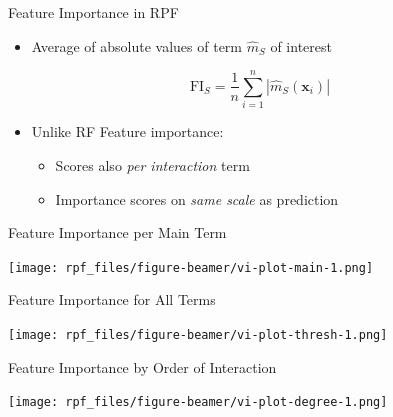 \documentclass[aspectratio=169,12pt]{beamer}
\providecommand{\tightlist}{%
  \setlength{\itemsep}{2pt}\setlength{\parskip}{0pt}}
\begin{document}
\begin{frame}{Feature Importance in RPF}
\label{feature-importance-in-rpf}
\begin{itemize}[<+->]
\tightlist
\item
  Average of absolute values of term \(\hat{m}_S\) of interest
\end{itemize}

\[\mathrm{FI}_S = \frac{1}{n} \sum_{i=1}^n |\hat{m}_S(\mathbf{x}_i)|\]

\begin{itemize}[<+->]
\tightlist
\item
  Unlike RF Feature importance:

  \begin{itemize}[<+->]
  \tightlist
  \item
    Scores also \emph{per interaction} term
  \item
    Importance scores on \emph{same scale} as prediction
  \end{itemize}
\end{itemize}
\end{frame}

\begin{frame}{Feature Importance per Main Term}
\label{feature-importance-per-main-term}
\begin{center}
\texttt{[image: rpf\_files/figure-beamer/vi-plot-main-1.png]}
\end{center}
\end{frame}

\begin{frame}{Feature Importance for All Terms}
\label{feature-importance-for-all-terms}
\begin{center}
\texttt{[image: rpf\_files/figure-beamer/vi-plot-thresh-1.png]}
\end{center}
\end{frame}

\begin{frame}{Feature Importance by Order of Interaction}
\label{feature-importance-by-order-of-interaction}
\begin{center}
\texttt{[image: rpf\_files/figure-beamer/vi-plot-degree-1.png]}
\end{center}
\end{frame}
\end{document}
